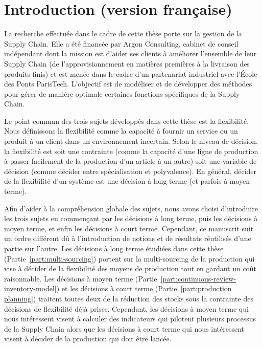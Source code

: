 \chapter{Introduction (version française)}
\label{chap:intro:fr}


La recherche effectuée dans le cadre de cette thèse porte sur la gestion de la Supply Chain.
Elle a été financée par Argon Consulting, cabinet de conseil indépendant dont la mission est d'aider ses clients à améliorer l'ensemble de leur Supply Chain (de l'approvisionnement en matières premières à la livraison des produits finis) et est menée dans le cadre d'un partenariat industriel avec l'\'Ecole des Ponts ParisTech.
L'objectif est de modéliser et de développer des méthodes pour gérer de manière optimale certaines fonctions spécifiques de la Supply Chain.


Le point commun des trois sujets développés dans cette thèse est la flexibilité.
Nous définissons la flexibilité comme la capacité à fournir un service ou un produit à un client dans un environnement incertain.
Selon le niveau de décision, la flexibilité est soit une contrainte (comme la capacité d'une ligne de production à passer facilement de la production d'un article à un autre) soit une variable de décision (comme décider entre spécialisation et polyvalence).
En général, décider de la flexibilité d'un système est une décision à long terme (et parfois à moyen terme).


Afin d'aider à la compréhension globale des sujets, nous avons choisi d'introduire les trois sujets en commençant par les décisions à long terme, puis les décisions à moyen terme, et enfin les décisions à court terme.
Cependant, ce manuscrit suit un ordre différent dû à l'introduction de notions et de résultats réutilisés d'une partie sur l'autre.
Les décisions à long terme étudiées dans cette thèse (Partie~\ref{part:multi-sourcing}) portent sur la multi-sourcing de la production qui vise à décider de la flexibilité des moyens de production tout en gardant un coût raisonnable.
Les décisions à moyen terme (Partie~\ref{part:continuous-review-inventory-model}) et les décisions à court terme (Partie~\ref{part:production planning}) traitent toutes deux de la réduction des stocks sous la contrainte des décisions de flexibilité déjà prises.
Cependant, les décisions à moyen terme qui nous intéressent visent à calculer des indicateurs qui pilotent plusieurs processus de la Supply Chain alors que les décisions à court terme qui nous intéressent visent à décider de la production qui doit être lancée.


